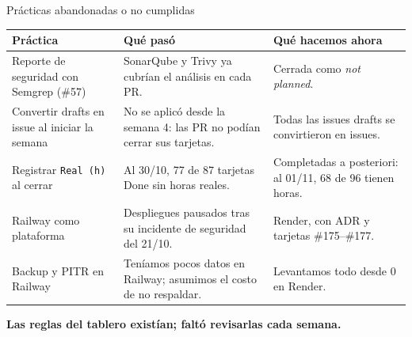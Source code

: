 
\begin{frame}{Prácticas abandonadas o no cumplidas}
\small
\begin{tabularx}{\textwidth}{>{\raggedright\arraybackslash}p{3.3cm}YY}
\toprule
\textbf{Práctica} & \textbf{Qué pasó} & \textbf{Qué hacemos ahora} \\
\midrule
Reporte de seguridad con Semgrep (\#57) & SonarQube y Trivy ya cubrían el análisis en cada PR. & Cerrada como \emph{not planned}. \\
Convertir drafts en issue al iniciar la semana & No se aplicó desde la semana 4: las PR no podían cerrar sus tarjetas. & Todas las issues drafts se convirtieron en issues. \\
Registrar \texttt{Real (h)} al cerrar & Al 30/10, 77 de 87 tarjetas Done sin horas reales. & Completadas a posteriori: al 01/11, 68 de 96 tienen horas. \\
Railway como plataforma & Despliegues pausados tras su incidente de seguridad del 21/10. & Render, con ADR y tarjetas \#175–\#177. \\
Backup y PITR en Railway & Teníamos pocos datos en Railway; asumimos el costo de no respaldar. & Levantamos todo desde 0 en Render. \\
\bottomrule
\end{tabularx}
\vspace{0.3cm}

\centering
\large\textbf{\color{academixnavy}Las reglas del tablero existían; faltó revisarlas cada semana.}
\end{frame}
